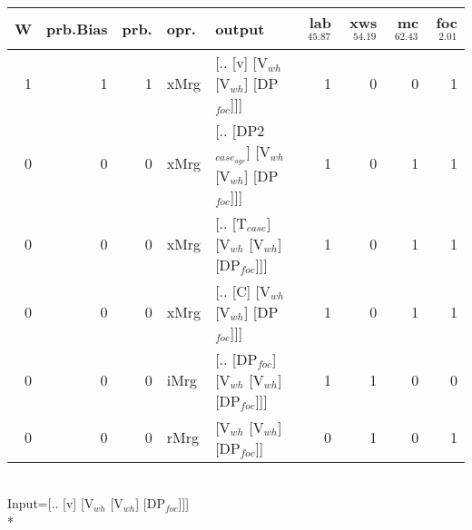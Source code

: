 \begin{tabularx}{\linewidth}{rrrlXrrrr}
\hline
   W &   prb.Bias &   prb. & opr.   & output                                     &   lab$^{45.87}$ &   xws$^{54.19}$ &   mc$^{62.43}$ &   foc$^{2.01}$ \\
\hline
   1 &       1 &   1 & xMrg & [.. [v] [V$_{wh}$ [V$_{wh}$] [DP$_{foc}$]]]            &             1 &             0 &            0 &          1 \\
   0 &       0 &   0 & xMrg & [.. [DP2$_{case_{agr}}$] [V$_{wh}$ [V$_{wh}$] [DP$_{foc}$]]] &             1 &             0 &            1 &          1 \\
   0 &       0 &   0 & xMrg & [.. [T$_{case}$] [V$_{wh}$ [V$_{wh}$] [DP$_{foc}$]]]       &             1 &             0 &            1 &          1 \\
   0 &       0 &   0 & xMrg & [.. [C] [V$_{wh}$ [V$_{wh}$] [DP$_{foc}$]]]            &             1 &             0 &            1 &          1 \\
   0 &       0 &   0 & iMrg & [.. [DP$_{foc}$] [V$_{wh}$ [V$_{wh}$] [DP$_{foc}$]]]       &             1 &             1 &            0 &          0 \\
   0 &       0 &   0 & rMrg & [V$_{wh}$ [V$_{wh}$] [DP$_{foc}$]]                     &             0 &             1 &            0 &          1 \\
\hline
\end{tabularx}\endgroup\\
\begingroup\scriptsize Input=[.. [v] [V$_{wh}$ [V$_{wh}$] [DP$_{foc}$]]]\\*

